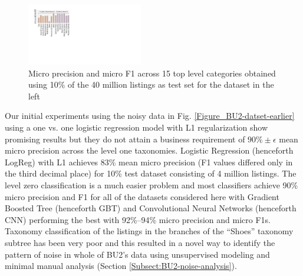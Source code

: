 \begin{figure}
	\centering
	\vspace{-0.6cm}
	\includegraphics[width=0.45\textwidth]{images/BU2-Dec2015-LogRegL1}
	\vspace{-0.7cm}
	\caption{{\small Micro precision and micro F1 across 15 top level categories obtained using 10\% of the 40 million listings as test set for the dataset in the left }}
	\label{Figure_BU2-WUC-LogRegL1}
	\vspace{-0.5cm}
\end{figure} 
Our initial experiments using the noisy data in Fig. \ref{Figure_BU2-datset-earlier} using a one vs. one logistic regression model with L1 regularization \cite{Yu13:EBay,LibShortText} show promising results but they do not attain a business requirement of $90\% \pm \epsilon$  mean micro precision across the level one taxonomies.
Logistic Regression (henceforth LogReg) with L1 achieves 83\% mean micro precision (F1 values differed only in the third decimal place) for 10\% test dataset consisting of 4 million listings.
The level zero classification is a much easier problem and most classifiers achieve 90\% micro precision and F1 for all of the datasets considered here with Gradient Boosted Tree (henceforth GBT) \cite{Friedman:GBT} and Convolutional Neural Networks (henceforth CNN) \cite{Kim14} performing the best with 92\%--94\% micro precision and micro F1s. 
Taxonomy classification of the listings in the branches of the ``Shoes'' taxonomy subtree has been very poor and this resulted in a novel way to identify the pattern of noise in whole of BU2's data using unsupervised modeling and minimal manual analysis (Section \ref{Subsect:BU2-noise-analysis}).

